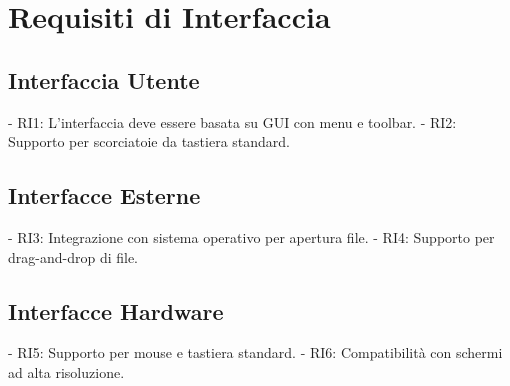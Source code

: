 \section{Requisiti di Interfaccia}

\subsection{Interfaccia Utente}

- RI1: L'interfaccia deve essere basata su GUI con menu e toolbar.
- RI2: Supporto per scorciatoie da tastiera standard.

\subsection{Interfacce Esterne}

- RI3: Integrazione con sistema operativo per apertura file.
- RI4: Supporto per drag-and-drop di file.

\subsection{Interfacce Hardware}

- RI5: Supporto per mouse e tastiera standard.
- RI6: Compatibilità con schermi ad alta risoluzione.